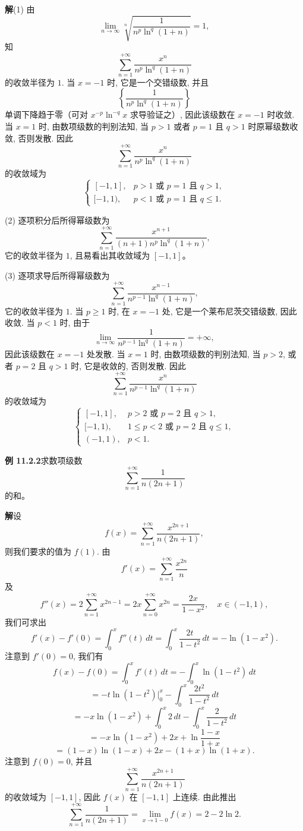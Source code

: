 \documentclass[UTF8,12pt,a4paper,fontset=fandol]{ctexart}
\begin{document}
\noindent\textbf{解}\quad (1) 由
\[
  \lim_{n\to\infty}
  \sqrt[n]{\frac1{n^p\ln^q(1+n)}}=1,
\]
知
\[
  \sum_{n=1}^{+\infty}\frac{x^n}{n^p\ln^q(1+n)}
\]
的收敛半径为 $1$. 当 $x=-1$ 时, 它是一个交错级数, 并且
\[
  \left\{\frac1{n^p\ln^q(1+n)}\right\}
\]
单调下降趋于零（可对 $x^{-p}\ln^{-q}x$ 求导验证之）, 因此该级数在 $x=-1$ 时收敛. 当 $x=1$ 时, 由数项级数的判别法知, 当 $p>1$ 或者 $p=1$ 且 $q>1$ 时原幂级数收敛, 否则发散. 因此
\[
  \sum_{n=1}^{+\infty}\frac{x^n}{n^p\ln^q(1+n)}
\]
的收敛域为
\[
  \begin{cases}
    [-1,1], & p>1\text{ 或 }p=1\text{ 且 }q>1,\\
    [-1,1), & p<1\text{ 或 }p=1\text{ 且 }q\leqslant1.
  \end{cases}
\]

(2) 逐项积分后所得幂级数为
\[
  \sum_{n=1}^{+\infty}
  \frac{x^{n+1}}{(n+1)n^p\ln^q(1+n)},
\]
它的收敛半径为 $1$, 且易看出其收敛域为 $[-1,1]$。

(3) 逐项求导后所得幂级数为
\[
  \sum_{n=1}^{+\infty}\frac{x^{n-1}}{n^{p-1}\ln^q(1+n)},
\]
它的收敛半径为 $1$. 当 $p\geqslant1$ 时, 在 $x=-1$ 处, 它是一个莱布尼茨交错级数, 因此收敛. 当 $p<1$ 时, 由于
\[
  \lim_{n\to\infty}\frac1{n^{p-1}\ln^q(1+n)}=+\infty,
\]
因此该级数在 $x=-1$ 处发散. 当 $x=1$ 时, 由数项级数的判别法知, 当 $p>2$, 或者 $p=2$ 且 $q>1$ 时, 它是收敛的, 否则发散. 因此
\[
  \sum_{n=1}^{+\infty}\frac{x^n}{n^{p-1}\ln^q(1+n)}
\]
的收敛域为
\[
  \begin{cases}
    [-1,1], & p>2\text{ 或 }p=2\text{ 且 }q>1,\\
    [-1,1), & 1\leqslant p<2\text{ 或 }p=2\text{ 且 }q\leqslant1,\\
    (-1,1), & p<1.
  \end{cases}
\]

\noindent\textbf{例 11.2.2}\quad 求数项级数
\[
  \sum_{n=1}^{+\infty}\frac1{n(2n+1)}
\]
的和。

\noindent\textbf{解}\quad 设
\[
  f(x)=\sum_{n=1}^{+\infty}\frac{x^{2n+1}}{n(2n+1)},
\]
则我们要求的值为 $f(1)$. 由
\[
  f'(x)=\sum_{n=1}^{+\infty}\frac{x^{2n}}n
\]
及
\[
  f''(x)=2\sum_{n=1}^{+\infty}x^{2n-1}
  =2x\sum_{n=0}^{+\infty}x^{2n}
  =\frac{2x}{1-x^2},\quad x\in(-1,1),
\]
我们可求出
\[
  f'(x)-f'(0)=\int_0^x f''(t)\,dt
  =
  \int_0^x\frac{2t}{1-t^2}\,dt
  =
  -\ln(1-x^2).
\]
注意到 $f'(0)=0$, 我们有
\[
  f(x)-f(0)
  =
  \int_0^x f'(t)\,dt
  =
  -\int_0^x\ln(1-t^2)\,dt
\]
\[
  =
  -t\ln(1-t^2)\Big|_0^x
  -
  \int_0^x\frac{2t^2}{1-t^2}\,dt
\]
\[
  =
  -x\ln(1-x^2)+\int_0^x2\,dt-\int_0^x\frac2{1-t^2}\,dt
\]
\[
  =
  -x\ln(1-x^2)+2x+\ln\frac{1-x}{1+x}
\]
\[
  =
  (1-x)\ln(1-x)+2x-(1+x)\ln(1+x).
\]
注意到 $f(0)=0$, 并且
\[
  \sum_{n=1}^{+\infty}\frac{x^{2n+1}}{n(2n+1)}
\]
的收敛域为 $[-1,1]$, 因此 $f(x)$ 在 $[-1,1]$ 上连续. 由此推出
\[
  \sum_{n=1}^{+\infty}\frac1{n(2n+1)}
  =
  \lim_{x\to1-0}f(x)
  =
  2-2\ln2.
\]
\end{document}
